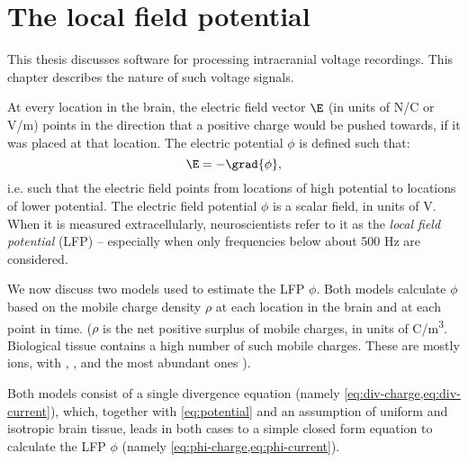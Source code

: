 \chapter{The local field potential}
\label{ch:LFP}

This thesis discusses software for processing intracranial voltage recordings. This chapter describes the nature of such voltage signals.

At every location in the brain, the electric field vector $\E$ (in units of N/C or V/m) points in the direction that a positive charge would be pushed towards, if it was placed at that location. The electric potential $\phi$ is defined\footnotemark{} such that:
%
\begin{equation}
\label{eq:potential}
\E = -\grad{\phi},
\end{equation}
%
i.e. such that the electric field points from locations of high potential to locations of lower potential. The electric field potential $\phi$ is a scalar field, in units of V. When it is measured extracellularly, neuroscientists refer to it as the \emph{local field potential} (LFP) -- especially when only frequencies below about 500 Hz are considered.


We now discuss two models used to estimate the LFP $\phi$. Both models calculate $\phi$ based on the mobile charge density $\rho$ at each location in the brain and at each point in time. ($\rho$ is the net positive surplus of mobile charges, in units of C/\si{\metre^3}. Biological tissue contains a high number of such mobile charges. These are mostly ions, with , , and  the most abundant ones \cite{Martinsen2015a}).

Both models consist of a single divergence equation (namely \cref{eq:div-charge,eq:div-current}), which, together with \cref{eq:potential} and an assumption of uniform and isotropic brain tissue, leads in both cases to a simple closed form equation to calculate the LFP $\phi$ (namely \cref{eq:phi-charge,eq:phi-current}).



